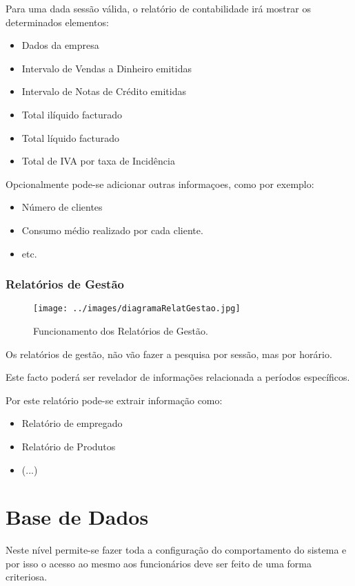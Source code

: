 \documentclass[a4paper,11pt,openany]{memoir}
\begin{document}
Para uma dada sessão válida, o relatório de contabilidade irá mostrar os determinados elementos:
\begin{itemize}
\item Dados da empresa
\item Intervalo de Vendas a Dinheiro emitidas
\item Intervalo de Notas de Crédito emitidas
\item Total ilíquido facturado
\item Total líquido facturado
\item Total de IVA por taxa de Incidência
\end{itemize}

Opcionalmente pode-se adicionar outras informaçoes, como por exemplo: 
\begin{itemize}
\item Número de clientes
\item Consumo médio realizado por cada cliente.
\item etc.
\end{itemize}


\subsection{Relatórios de Gestão}

\begin{figure}
\texttt{[image: ../images/diagramaRelatGestao.jpg]}
\caption[Submanifold]{Funcionamento dos Relatórios de Gestão.}
\end{figure}

Os relatórios de gestão, não vão fazer a pesquisa por sessão, mas por horário.

Este facto poderá ser revelador de informações relacionada a períodos específicos.

Por este relatório pode-se extrair informação como:
\begin{itemize}
\item Relatório de empregado
\item Relatório de Produtos
\item (...)
\end{itemize}


\chapter{Base de Dados}

Neste nível permite-se fazer toda a configuração do comportamento do sistema e por isso o acesso
ao mesmo aos funcionários deve ser feito de uma forma criteriosa.
\end{document}
